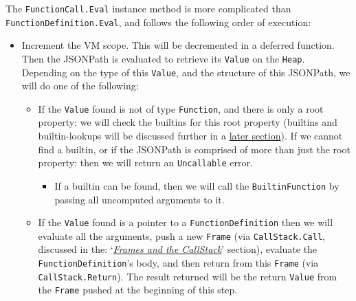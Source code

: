 \inputminted[firstline=374, lastline=379, autogobble, breaklines, tabsize=4]{go}{../../src/parser/functions.go}

The \verb|FunctionCall.Eval| instance method is more complicated than \verb|FunctionDefinition.Eval|, and follows the following order of execution:

\begin{itemize}
    \item Increment the VM scope. This will be decremented in a deferred function. Then the JSONPath is evaluated to retrieve its \verb|Value| on the \verb|Heap|. Depending on the type of this \verb|Value|, and the structure of this JSONPath, we will do one of the following:
    \begin{itemize}
        \item If the \verb|Value| found is not of type \verb|Function|, and there is only a root property: we will check the builtins for this root property (builtins and builtin-lookups will be discussed further in a \hyperref[sec:development-builtins]{later section}). If we cannot find a builtin, or if the JSONPath is comprised of more than just the root property: then we will return an \verb|Uncallable| error.
        \begin{itemize}
            \item If a builtin can be found, then we will call the \verb|BuiltinFunction| by passing all uncomputed arguments to it.
        \end{itemize}
        \item If the \verb|Value| found is a pointer to a \verb|FunctionDefinition| then we will evaluate all the arguments, push a new \verb|Frame| (via \verb|CallStack.Call|, discussed in the: `\textit{\hyperref[sec:data-structures-frames-callstack]{Frames and the CallStack}}' section), evaluate the \verb|FunctionDefinition|'s body, and then return from this \verb|Frame| (via \verb|CallStack.Return|). The result returned will be the return \verb|Value| from the \verb|Frame| pushed at the beginning of this step.
    \end{itemize}
\end{itemize}
